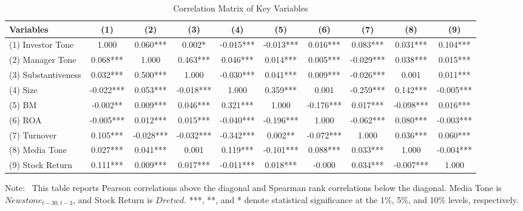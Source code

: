 \documentclass[12pt]{article}
\newenvironment{tablenoteblock}
{%
  \vspace{0.12cm}
  \begin{tablenotes}[flushleft]
  \footnotesize
  \setlength{\itemsep}{0pt}
  \setlength{\parsep}{0pt}
  \item[]\justifying
  \textnormal{Note:}\ 
}
{%
  \end{tablenotes}
}
\begin{document}
\begin{table}
  \centering
  \caption{Correlation Matrix of Key Variables}
  \label{tab:correlation_matrix}
  \vspace{0.2cm}
  \renewcommand{\arraystretch}{1.08}
  \setlength{\tabcolsep}{4pt}
  \footnotesize
  \begin{threeparttable}
  \begin{tabular*}{\textheight}{@{\extracolsep{\fill}}l*{9}{c}@{}}
    \toprule
    \textbf{Variables} & \textbf{(1)} & \textbf{(2)} & \textbf{(3)} & \textbf{(4)} & \textbf{(5)} & \textbf{(6)} & \textbf{(7)} & \textbf{(8)} & \textbf{(9)} \\
    \midrule
    (1) Investor Tone & 1.000 & 0.060*** & 0.002* & -0.015*** & -0.013*** & 0.016*** & 0.083*** & 0.031*** & 0.104*** \\
    (2) Manager Tone & 0.068*** & 1.000 & 0.463*** & 0.046*** & 0.014*** & 0.005*** & -0.029*** & 0.038*** & 0.015*** \\
    (3) Substantiveness & 0.032*** & 0.500*** & 1.000 & -0.030*** & 0.041*** & 0.009*** & -0.026*** & 0.001 & 0.011*** \\
    (4) Size & -0.022*** & 0.053*** & -0.018*** & 1.000 & 0.359*** & 0.001 & -0.259*** & 0.142*** & -0.005*** \\
    (5) BM & -0.002** & 0.009*** & 0.046*** & 0.321*** & 1.000 & -0.176*** & 0.017*** & -0.098*** & 0.016*** \\
    (6) ROA & -0.005*** & 0.012*** & 0.015*** & -0.040*** & -0.196*** & 1.000 & -0.062*** & 0.080*** & -0.003*** \\
    (7) Turnover & 0.105*** & -0.028*** & -0.032*** & -0.342*** & 0.002** & -0.072*** & 1.000 & 0.036*** & 0.060*** \\
    (8) Media Tone & 0.027*** & 0.041*** & 0.001 & 0.119*** & -0.101*** & 0.088*** & 0.033*** & 1.000 & -0.004*** \\
    (9) Stock Return & 0.111*** & 0.009*** & 0.017*** & -0.011*** & 0.018*** & -0.000 & 0.034*** & -0.007*** & 1.000 \\
    \bottomrule
  \end{tabular*}\par
  \begin{tablenoteblock}
    This table reports Pearson correlations above the diagonal and Spearman rank correlations below the diagonal. Media Tone is $Newstone_{t-30,t-3}$, and Stock Return is $Dretwd$. ***, **, and * denote statistical significance at the 1\%, 5\%, and 10\% levels, respectively.
  \end{tablenoteblock}
  \end{threeparttable}
\end{table}
\clearpage
\end{document}
